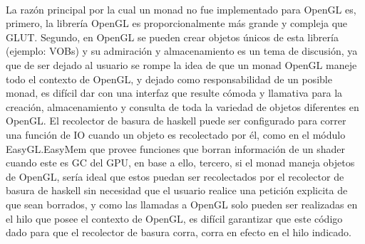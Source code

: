 \documentclass{standalone}
\begin{document}
\paragraph{}
La razón principal por la cual un monad no fue implementado para OpenGL es, primero, la librería OpenGL es proporcionalmente más grande y compleja que GLUT. Segundo, en OpenGL se pueden crear objetos únicos de esta librería (ejemplo: VOBs) y su admiración y almacenamiento es un tema de discusión, ya que de ser dejado al usuario se rompe la idea de que un monad OpenGL maneje todo el contexto de OpenGL, y dejado como responsabilidad de un posible monad, es difícil dar con una interfaz que resulte cómoda y llamativa para la creación, almacenamiento y consulta de toda la variedad de objetos diferentes en OpenGL. El recolector de basura de haskell puede ser configurado para correr una función de IO cuando un objeto es recolectado por él, como en el módulo EasyGL.EasyMem que provee funciones que borran información de un shader cuando este es GC del GPU, en base a ello, tercero, si el monad maneja objetos de OpenGL, sería ideal que estos puedan ser recolectados por el recolector de basura de haskell sin necesidad que el usuario realice una petición explicita de que sean borrados, y como las llamadas a OpenGL solo pueden ser realizadas en el hilo que posee el contexto de OpenGL, es difícil garantizar que este código dado para que el recolector de basura corra, corra en efecto en el hilo indicado.
\end{document}
